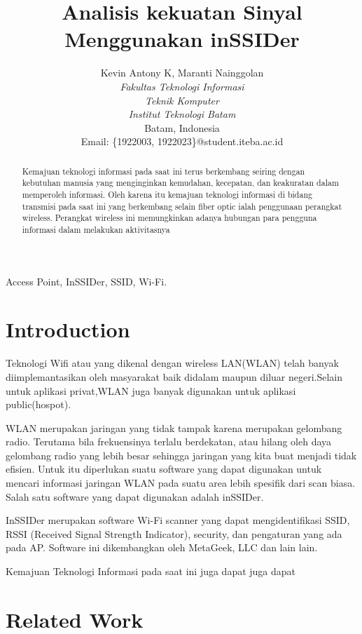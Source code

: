 \documentclass[conference]{IEEEtran}
\title{Analisis kekuatan Sinyal Menggunakan inSSIDer}
\author{Kevin Antony K\IEEEauthorrefmark{1}, Maranti Nainggolan\IEEEauthorrefmark{2}\\
\textit{Fakultas Teknologi Informasi}\\
\textit{Teknik Komputer}\\
\textit{Institut Teknologi Batam}\\
Batam, Indonesia\\
Email: \{\IEEEauthorrefmark{1}1922003, \IEEEauthorrefmark{2}1922023\}@student.iteba.ac.id}
\begin{document}
\maketitle

\begin{abstract}
    
Kemajuan teknologi informasi pada saat ini
terus berkembang seiring dengan kebutuhan manusia yang
menginginkan kemudahan, kecepatan, dan keakuratan dalam
memperoleh informasi. Oleh karena itu kemajuan teknologi
informasi di bidang transmisi pada saat ini yang berkembang
selain fiber optic ialah penggunaan perangkat wireless. Perangkat
wireless ini memungkinkan adanya hubungan para pengguna
informasi dalam melakukan aktivitasnya
\end{abstract}

\begin{IEEEkeywords}
Access Point, InSSIDer, SSID, Wi-Fi.
\end{IEEEkeywords}

\section{Introduction}
Teknologi Wifi atau yang dikenal dengan wireless LAN(WLAN) telah banyak diimplemantasikan 
oleh masyarakat baik didalam maupun diluar negeri.Selain untuk aplikasi privat,WLAN 
juga banyak digunakan untuk aplikasi public(hospot).\

\vspace{0.2cm}

WLAN merupakan jaringan yang tidak tampak karena
merupakan gelombang radio. Terutama bila frekuensinya terlalu
berdekatan, atau hilang oleh daya gelombang radio yang
lebih besar sehingga jaringan yang kita buat menjadi tidak
efisien. Untuk itu diperlukan suatu software yang dapat digunakan
untuk mencari informasi jaringan WLAN pada suatu
area lebih spesifik dari scan biasa. Salah satu software yang
dapat digunakan adalah inSSIDer.\

\vspace{0.2cm}

InSSIDer merupakan software Wi-Fi scanner yang dapat
mengidentifikasi SSID, RSSI (Received Signal Strength Indicator),
security, dan pengaturan yang ada pada AP. Software
ini dikembangkan oleh MetaGeek, LLC dan lain lain.


Kemajuan Teknologi Informasi pada saat ini juga dapat juga dapat


\section{Related Work}
\end{document}
